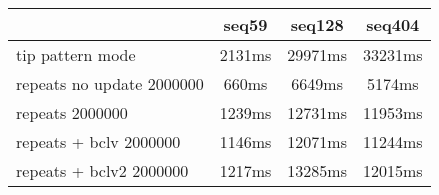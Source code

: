 \begin{tabular}{|l|c|c|c|}
\hline
 & seq59 & seq128 & seq404  \\
\hline
tip pattern mode &  2131ms &  29971ms &  33231ms\\
\hline
repeats no update 2000000 &  660ms &  6649ms &  5174ms\\
\hline
repeats 2000000 &  1239ms &  12731ms &  11953ms\\
\hline
repeats + bclv 2000000 &  1146ms &  12071ms &  11244ms\\
\hline
repeats + bclv2 2000000 &  1217ms &  13285ms &  12015ms\\
\hline
\end{tabular}
